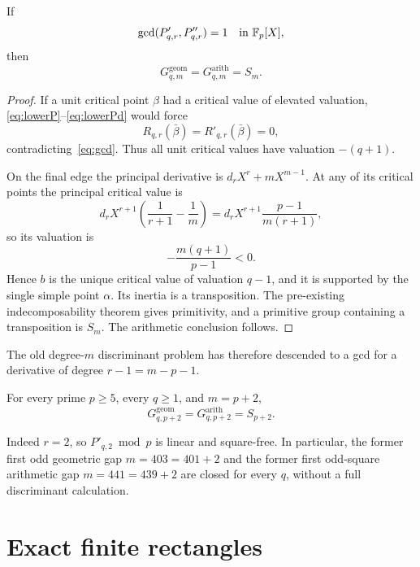 \begin{theorem}\label{thm:window}
If
\begin{equation}
\gcd(P'_{q,r},P''_{q,r})=1
\quad\text{in }\mathbb F_p[X],
\label{eq:gcd}
\end{equation}
then
\begin{equation}
\boxed{G^{\mathrm{geom}}_{q,m}=G^{\mathrm{arith}}_{q,m}=S_m.}
\label{eq:window-mon}
\end{equation}
\end{theorem}

\begin{proof}
If a unit critical point $\beta$ had a critical value of elevated
valuation, \eqref{eq:lowerP}--\eqref{eq:lowerPd} would force
\[
R_{q,r}(\bar\beta)=R'_{q,r}(\bar\beta)=0,
\]
contradicting~\eqref{eq:gcd}. Thus all unit critical values have valuation
$-(q+1)$.

On the final edge the principal derivative is
$d_rX^r+mX^{m-1}$. At any of its critical points the principal critical
value is
\[
d_rX^{r+1}
\left(\frac1{r+1}-\frac1m\right)
=d_rX^{r+1}\frac{p-1}{m(r+1)},
\]
so its valuation is
\[
-\frac{m(q+1)}{p-1}<0.
\]
Hence $b$ is the unique critical value of valuation $q-1$, and it is
supported by the single simple point $\alpha$. Its inertia is a
transposition. The pre-existing indecomposability theorem gives primitivity,
and a primitive group containing a transposition is $S_m$. The arithmetic
conclusion follows.
\end{proof}

The old degree-$m$ discriminant problem has therefore descended to a gcd for
a derivative of degree $r-1=m-p-1$.

\begin{corollary}\label{cor:shifted}
For every prime $p\ge5$, every $q\ge1$, and $m=p+2$,
\begin{equation}
\boxed{G^{\mathrm{geom}}_{q,p+2}=G^{\mathrm{arith}}_{q,p+2}=S_{p+2}.}
\label{eq:shifted}
\end{equation}
\end{corollary}

Indeed $r=2$, so $P'_{q,2}\bmod p$ is linear and square-free. In
particular, the former first odd geometric gap $m=403=401+2$ and the former
first odd-square arithmetic gap $m=441=439+2$ are closed for every $q$,
without a full discriminant calculation.

\section{Exact finite rectangles}

